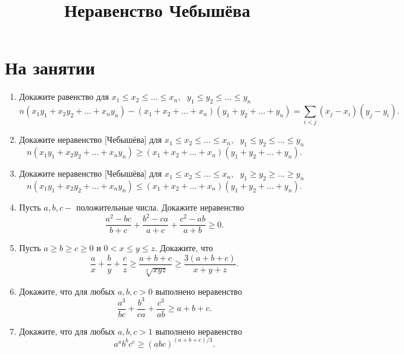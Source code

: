 \documentclass[a4paper,12pt,leqno]{article}
\title{Неравенство Чебышёва}
\date{}
\begin{document}
	
	\maketitle


	\newcommand{\z}{\addtocounter{num}{1}%
	\boxed{\arabic{num}} }

	\section*{На занятии}
	
	\begin{enumerate}
		\item[\z] Докажите равенство для $x_1 \leqslant x_2 \leqslant \dots \leqslant x_n,\;$ $y_1 \leqslant y_2 \leqslant \dots \leqslant y_n$ $$n (x_1y_1 + x_2y_2 + \dots + x_ny_n) - (x_1+x_2 + \dots + x_n)(y_1+y_2 + \dots + y_n) = 
		\sum\limits_{i < j} (x_j - x_i)(y_j-y_i).$$
		
		\item[\z] Докажите неравенство [Чебышёва] для $x_1 \leqslant x_2 \leqslant \dots \leqslant x_n,\;$ $y_1 \leqslant y_2 \leqslant \dots \leqslant y_n$
		$$n(x_1y_1 + x_2y_2 + \dots + x_ny_n) \geqslant (x_1+x_2 + \dots + x_n)(y_1+y_2 + \dots + y_n).$$

		\item[\z] Докажите неравенство [Чебышёва] для $x_1 \leqslant x_2 \leqslant \dots \leqslant x_n,\;$ $y_1 \geqslant y_2 \geqslant \dots \geqslant y_n$
		$$n(x_1y_1 + x_2y_2 + \dots + x_ny_n) \leqslant (x_1+x_2 + \dots + x_n)(y_1+y_2 + \dots + y_n).$$

		\item[\z] Пусть $a, b, c -$ положительные числа. Докажите неравенство
		$$\frac{a^2-bc}{b+c} + \frac{b^2-ca}{a+c} + \frac{c^2-ab}{a+b} \geqslant 0.$$

		\item[\z] Пусть $a \geqslant b \geqslant c \geqslant 0$ и $0 < x \leqslant y \leqslant z$. Докажите, что
		$$\frac{a}{x} + \frac{b}{y} + \frac{c}{z} \geqslant \frac{a+b+c}{\sqrt[3]{xyz}} \geqslant \frac{3(a+b+c)}{x+y+z}.$$

		\item[\z] Докажите, что для любых $a, b, c > 0$ выполнено неравенство 
		$$\frac{a^3}{bc} + \frac{b^3}{ca} + \frac{c^3}{ab} \geqslant a + b + c.$$

		\item[\z] Докажите, что для любых $a, b, c > 1$ выполнено неравенство
		$$a^ab^bc^c \geqslant (abc)^{(a+b+c)/3}.$$


\end{enumerate}
\end{document}
